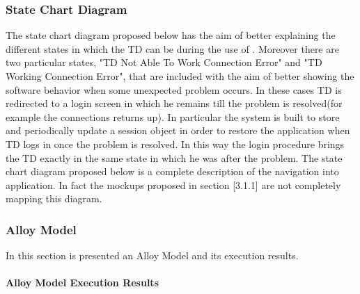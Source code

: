 \subsubsection{State Chart Diagram}
\begin{itemize}
	 The state chart diagram proposed below has the aim of better explaining the different states in which the TD can be during the use of \myTaxiService{}. 
		Moreover there are two particular states, "TD Not Able To Work Connection Error" and "TD Working Connection Error", that are included with the aim of better showing the software behavior when some unexpected problem occurs. 
		In these cases TD is redirected to a login screen in which he remains till the problem is resolved(for example the connections returns up). 
		In particular the system is built to store and periodically update a session object in order to restore the application when TD logs in once the problem is resolved.  
		In this way the login procedure  brings the TD exactly in the same state in which he was after the problem.
	 The state chart diagram proposed below is a complete description of the navigation into \myTaxiService{} application.
		In fact the mockups proposed in section [3.1.1] are not completely mapping this diagram.
\end{itemize}
\newpage

\subsubsection{Alloy Model}
In this section is presented an Alloy Model and its execution results.

\paragraph{Alloy Model Execution Results}
\begin{itemize}
	  \newpage
	  \newpage
	  \newpage
	  \newpage
\end{itemize}


